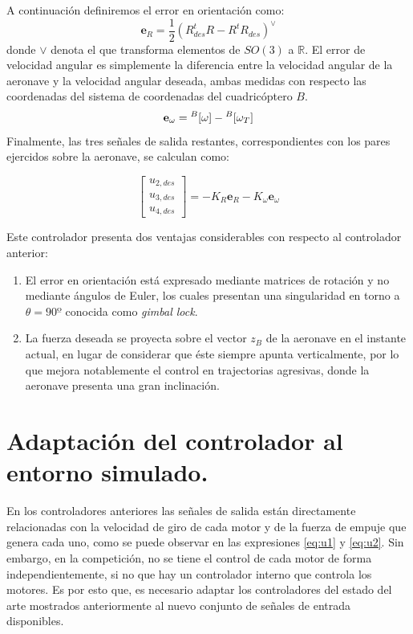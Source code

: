 A continuación definiremos el error en orientación como:
\begin{equation}
	\mathbf{e}_R = \frac{1}{2}\left(R_{des}^t R - R^t R_{des} \right)^\vee
\end{equation}
donde $\vee$ denota el  que transforma elementos de $SO(3)$ a $\mathbb{R}$. El error de velocidad angular es simplemente la diferencia entre la velocidad angular de la aeronave y la velocidad angular deseada, ambas medidas con respecto las coordenadas del sistema de coordenadas del cuadricóptero $B$.
\begin{equation}
	\mathbf{e}_\omega = \null^B[\omega]-\null^B[\omega_T] 
\end{equation}
Finalmente, las tres señales de salida restantes, correspondientes con los pares ejercidos sobre la aeronave, se calculan como:

\begin{equation}
	\label{eq:u2_non_linearized}
\begin{bmatrix}
	u_{2,des}\\u_{3,des}\\u_{4,des} 
\end{bmatrix}= -K_R	\mathbf{e}_R - K_\omega	\mathbf{e}_\omega
\end{equation}

Este controlador presenta dos ventajas considerables con respecto al controlador anterior:
\begin{enumerate}
	\item El error en orientación está expresado mediante matrices de rotación y no mediante ángulos de Euler, los cuales presentan una singularidad en torno a $\theta = 90º$ conocida como \textit{gimbal lock}.
	\item La fuerza deseada se proyecta sobre el vector $z_B$ de la aeronave en el instante actual, en lugar de considerar que éste siempre apunta verticalmente, por lo que mejora notablemente el control en trajectorias agresivas, donde la aeronave presenta una gran inclinación.
\end{enumerate}


\section{Adaptación del controlador al entorno simulado.}

En los controladores anteriores las señales de salida están directamente relacionadas con la velocidad de giro de cada motor y de la fuerza de empuje que genera cada uno, como se puede observar en las expresiones \ref{eq:u1} y \ref{eq:u2}. Sin embargo, en la competición, no se tiene el control de cada motor de forma independientemente, si no que hay un controlador interno que controla los motores. Es por esto que, es necesario adaptar los controladores del estado del arte mostrados anteriormente al nuevo conjunto de señales de entrada disponibles.

